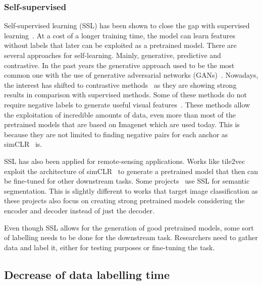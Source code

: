 \documentclass[conference]{IEEEtran}
\begin{document}
    \subsubsection{Self-supervised}
    Self-supervised learning (SSL) has been shown to close the gap with supervised learning~\cite{gui2023survey}.
    At a cost of a longer training time, the model can learn features without labels that later can be exploited as a pretrained model.
    There are several approaches for self-learning.
    Mainly, generative, predictive and contrastive.
    In the past years the generative approach used to be the most common one with the use of generative adversarial networks (GANs)~\cite{goodfellow2014generative, radford2016unsupervised}.
    Nowadays, the interest has shifted to contrastive methods~\cite{chen2020simple, Jung2021SelfsupervisedLW, caron2021unsupervised} as they are showing strong results in comparison with supervised methods.
    Some of these methods do not require negative labels to generate useful visual features~\cite{DINO, barlowtwins, grill2020bootstrap}.
    These methods allow the exploitation of incredible amounts of data, even more than most of the pretrained models that are based on Imagenet which are used today.
    This is because they are not limited to finding negative pairs for each anchor as simCLR~\cite{chen2020simple} is.

    SSL has also been applied for remote-sensing applications.
    Works like tile2vec~\cite{jean2019tile2vec} exploit the architecture of simCLR~\cite{chen2020simple} to generate a pretrained model that
    then can be fine-tuned for other downstream tasks.
    Some projects~\cite{inproceedings, 9460820, Li_2022, akiva2020h2onet} use SSL for semantic segmentation.
    This is slightly different to works that target image classification as these projects also focus on creating strong pretrained models considering
    the encoder and decoder instead of just the decoder.

    Even though SSL allows for the generation of good pretrained models, some sort of labelling needs to be done for the downstream task.
    Researchers need to gather data and label it, either for testing purposes or fine-tuning the task.

    \subsection*{Decrease of data labelling time}
\end{document}
